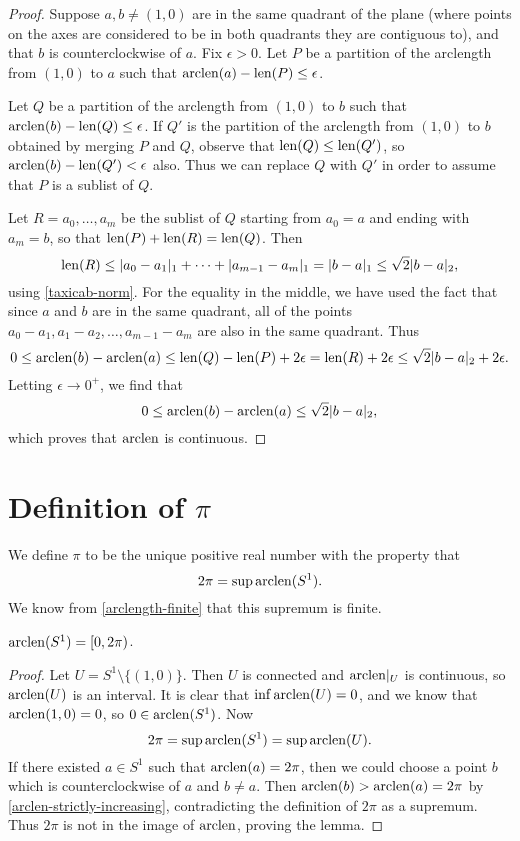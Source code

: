 \begin{proof}
	Suppose $a, b \neq (1,0)$ are in the same quadrant of the plane (where points on the axes are considered to be in both quadrants they are contiguous to), and that $b$ is  counterclockwise of $a$. Fix $\epsilon > 0$. Let $P$ be a partition of the arclength from $(1,0)$ to $a$ such that $\mathrm{arclen}(a) - \mathrm{len}(P) \leq \epsilon$. 
	
	Let $Q$ be a partition of the arclength from $(1,0)$ to $b$ such that $\mathrm{arclen}(b) - \mathrm{len}(Q) \leq \epsilon$. If $Q'$ is the partition of the arclength from $(1,0)$ to $b$ obtained by merging $P$ and $Q$, observe that $\mathrm{len}(Q) \leq \mathrm{len}(Q')$, so $\mathrm{arclen}(b) - \mathrm{len}(Q') < \epsilon$ also. Thus we can replace $Q$ with $Q'$ in order to assume that $P$ is a sublist of $Q$. 
	
	Let $R = a_0, \dotsc, a_m$ be the sublist of $Q$ starting from $a_0 = a$ and ending with $a_m = b$, so that $\mathrm{len}(P) + \mathrm{len}(R) = \mathrm{len}(Q)$. Then 
	\[ \mathrm{len}(R) \leq |a_0 - a_1|_1 + \dotsb + |a_{m-1} - a_m|_1 = |b-a|_1 \leq \sqrt{2}|b-a|_2, \]
	using \cref{taxicab-norm}. For the equality in the middle, we have used the fact that since $a$ and $b$ are in the same quadrant, all of the points $a_0 - a_1, a_1 - a_2, \dotsc, a_{m-1} - a_m$ are also in the same quadrant. Thus
	\[ 0 \leq \mathrm{arclen}(b) - \mathrm{arclen}(a) \leq \mathrm{len}(Q) - \mathrm{len}(P) + 2\epsilon = \mathrm{len}(R) + 2\epsilon \leq \sqrt{2}|b-a|_2 + 2\epsilon. \]
	Letting $\epsilon \to 0^+$, we find that 
	\[ 0 \leq \mathrm{arclen}(b) - \mathrm{arclen}(a) \leq \sqrt{2}|b-a|_2, \]
	which proves that $\mathrm{arclen}$ is continuous. 
\end{proof}

\section{Definition of \texorpdfstring{$\pi$}{pi}}

\begin{definition}
	We define $\pi$ to be the unique positive real number with  the property that 
	\[ 2\pi = \sup \mathrm{arclen}(S^1). \]
	We know from \cref{arclength-finite} that this supremum is finite. 
\end{definition}

\begin{lemma}
	$\mathrm{arclen}(S^1) = [0, 2\pi)$. 
\end{lemma}

\begin{proof}
	Let $U = S^1 \setminus \{(1,0)\}$. Then $U$ is connected and $\mathrm{arclen}|_U$ is continuous, so $\mathrm{arclen}(U)$ is an interval. It is clear that $\inf \mathrm{arclen}(U) = 0$, and we know that $\mathrm{arclen}(1,0) = 0$, so $0 \in \mathrm{arclen}(S^1)$. Now \[ 2\pi = \sup \mathrm{arclen}(S^1) = \sup \mathrm{arclen}(U). \]
	If there existed $a \in S^1$ such that $\mathrm{arclen}(a) = 2\pi$, then we could choose a point $b$ which is counterclockwise of $a$ and $b \neq a$. Then $\mathrm{arclen}(b) > \mathrm{arclen}(a) = 2\pi$ by \cref{arclen-strictly-increasing}, contradicting the definition of $2\pi$ as a supremum. Thus $2\pi$ is not in the image of $\mathrm{arclen}$, proving the lemma.  
\end{proof}


